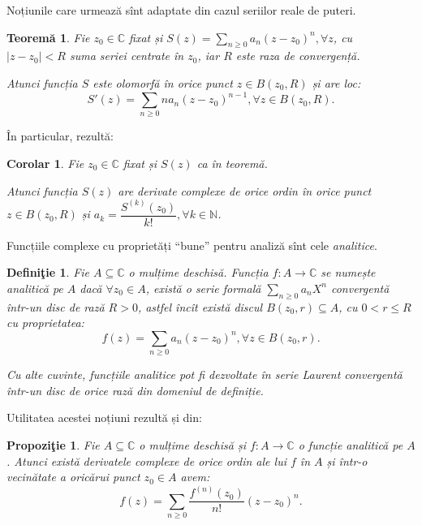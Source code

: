 \documentclass[12pt,a4paper]{article}
\newcommand\qq{\enquote}
\newcommand\ds{\displaystyle}
\newcommand\seq{\subseteq}
\newcommand\NN{\mathbb{N}}
\newcommand\CC{\mathbb{C}}
\theoremstyle{dotless}
\newtheorem{theorem}{Teorem\u{a}}
\newtheorem{proposition}{Propozi\c{t}ie}
\newtheorem{corollary}{Corolar}
\theoremstyle{dotlessdr}
\newtheorem{definition}{Defini\c{t}ie}
\begin{document}
Noțiunile care urmează sînt adaptate din cazul seriilor reale de puteri.

\begin{theorem}\label{thm:serie-p}
  Fie $ z_0 \in \CC $ fixat și $ S(z) = \ds\sum_{n \geq 0} a_n(z - z_0)^n, \forall z $,
  cu $ |z - z_0| < R $ suma seriei centrate în $ z_0 $, iar $ R $ este raza de
  convergență.

  Atunci funcția $ S $ este olomorfă în orice punct $ z \in B(z_0, R) $ și are loc:
  \[
    S'(z) = \sum_{n \geq 0} na_n(z - z_0)^{n - 1}, \forall z \in B(z_0, R).
  \]
\end{theorem}

În particular, rezultă:

\begin{corollary}\label{cor:serie-p}
  Fie $ z_0 \in \CC $ fixat și $ S(z) $ ca în teoremă.

  Atunci funcția $ S(z) $ are derivate complexe de orice ordin în orice punct
  $ z \in B(z_0, R) $ și $ a_k = \dfrac{S^{(k)}(z_0)}{k!}, \forall k \in \NN $.
\end{corollary}

Funcțiile complexe cu proprietăți \qq{bune} pentru analiză sînt cele \emph{analitice}.

\begin{definition}\label{def:f-analitica}
  Fie $ A \seq \CC $ o mulțime deschisă. Funcția $ f : A \to \CC $ se numește
  \emph{analitică} pe $ A $ dacă $ \forall z_0 \in A $, există o serie formală
  $\sum_{n \geq 0} a_n X^n $ convergentă într-un disc de rază $ R > 0 $,
  astfel încît există discul $ B(z_0, r) \seq A $, cu $ 0 < r \leq R $
  cu proprietatea:
  \[
    f(z) = \sum_{n \geq 0} a_n(z - z_0)^n, \forall z \in B(z_0, r).
  \]

  Cu alte cuvinte, funcțiile analitice pot fi dezvoltate în serie Laurent
  convergentă într-un disc de orice rază din domeniul de definiție.
\end{definition}

Utilitatea acestei noțiuni rezultă și din:

\begin{proposition}\label{pr:analitica-der}
  Fie $ A \seq \CC $ o mulțime deschisă și $ f : A \to \CC $ o funcție analitică
  pe $ A $. Atunci există derivatele complexe de orice ordin ale lui $ f $ în $ A $
  și într-o vecinătate a oricărui punct $ z_0 \in A $ avem:
  \[
    f(z) = \sum_{n \geq 0} \frac{f^{(n)}(z_0)}{n!} (z - z_0)^n.
  \]
\end{proposition}
\end{document}
